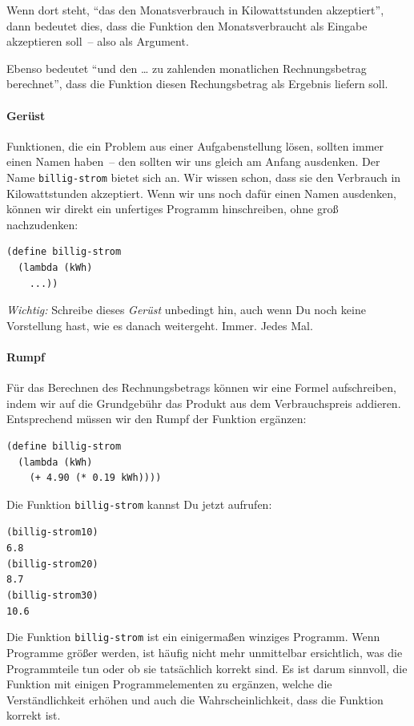 Wenn dort steht, "`das den Monatsverbrauch in Kilowattstunden
akzeptiert"', dann bedeutet dies, dass die Funktion den
Monatsverbraucht als Eingabe akzeptieren soll~-- also als Argument.

Ebenso bedeutet "`und den \ldots{} zu zahlenden monatlichen
Rechnungsbetrag berechnet"', dass die Funktion diesen Rechungsbetrag
als Ergebnis liefern soll.

\paragraph{Gerüst}

Funktionen, die ein Problem aus einer Aufgabenstellung lösen, sollten
immer einen Namen haben~-- den sollten wir uns gleich am Anfang
ausdenken.  Der Name \texttt{billig-strom} bietet sich an.  Wir wissen
schon, dass sie den Verbrauch in Kilowattstunden akzeptiert.  Wenn wir
uns noch dafür einen Namen ausdenken, können wir direkt ein unfertiges
Programm hinschreiben, ohne groß nachzudenken:
%
\begin{verbatim}
(define billig-strom
  (lambda (kWh)
    ...))
\end{verbatim}
%
\emph{Wichtig:} Schreibe dieses \textit{Gerüst}
unbedingt hin, auch wenn Du noch keine Vorstellung hast, wie es danach
weitergeht.  Immer.  Jedes Mal.

\paragraph{Rumpf}

Für das Berechnen des Rechnungsbetrags können wir eine Formel
aufschreiben, indem wir auf die Grundgebühr das Produkt aus dem
Verbrauchspreis addieren.  Entsprechend müssen wir den Rumpf der
Funktion ergänzen:
%
\begin{verbatim}
(define billig-strom
  (lambda (kWh)
    (+ 4.90 (* 0.19 kWh))))
\end{verbatim}
%
Die Funktion \texttt{billig-strom} kannst Du jetzt aufrufen:
%
\begin{alltt}
(billig-strom 10)
\evalsto{} 6.8
(billig-strom 20)
\evalsto{} 8.7
(billig-strom 30)
\evalsto{} 10.6
\end{alltt}
%
Die Funktion \texttt{billig-strom} ist ein einigermaßen winziges
Programm.  Wenn Programme größer werden, ist häufig nicht mehr
unmittelbar ersichtlich, was die Programmteile tun oder ob sie
tatsächlich korrekt sind.  Es ist darum sinnvoll, die Funktion mit
einigen Programmelementen zu ergänzen, welche die Verständlichkeit
erhöhen und auch die Wahrscheinlichkeit, dass die Funktion korrekt
ist.

